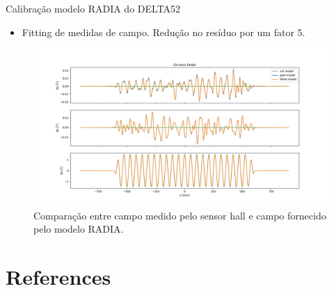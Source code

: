 \documentclass{beamer}					%
\begin{document}
\begin{frame}{Calibração modelo RADIA do DELTA52}
\begin{itemize}
        \item Fitting de medidas de campo. Redução no resíduo por um fator 5.
	\end{itemize}
\begin{figure}[H]
		\centering
        \includegraphics[width=.9\textwidth]{figures/field_fitting.png}
        \caption{Comparação entre campo medido pelo sensor hall e campo fornecido pelo modelo RADIA.}
        \label{fig:field_fitting}
    \end{figure}
\end{frame}


\section{References}

% 	
\end{document}

